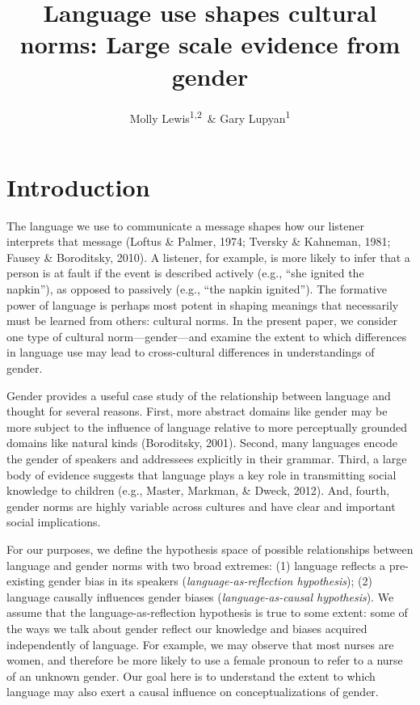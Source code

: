 \documentclass[man]{apa6}
\title{Language use shapes cultural norms: Large scale evidence from gender}
\author{Molly Lewis\textsuperscript{1,2}~\& Gary Lupyan\textsuperscript{1}}
\date{}
\affiliation{
\vspace{0.5cm}
\textsuperscript{1} University of Wisconsin-Madison\\\textsuperscript{2} University of Chicago}
\theoremstyle{definition}
\theoremstyle{definition}
\theoremstyle{definition}
\theoremstyle{remark}
\begin{document}
\maketitle

\section{Introduction}\label{introduction}

The language we use to communicate a message shapes how our listener
interprets that message (Loftus \& Palmer, 1974; Tversky \& Kahneman,
1981; Fausey \& Boroditsky, 2010). A listener, for example, is more
likely to infer that a person is at fault if the event is described
actively (e.g., \enquote{she ignited the napkin}), as opposed to
passively (e.g., \enquote{the napkin ignited}). The formative power of
language is perhaps most potent in shaping meanings that necessarily
must be learned from others: cultural norms. In the present paper, we
consider one type of cultural norm---gender---and examine the extent to
which differences in language use may lead to cross-cultural differences
in understandings of gender.

Gender provides a useful case study of the relationship between language
and thought for several reasons. First, more abstract domains like
gender may be more subject to the influence of language relative to more
perceptually grounded domains like natural kinds (Boroditsky, 2001).
Second, many languages encode the gender of speakers and addressees
explicitly in their grammar. Third, a large body of evidence suggests
that language plays a key role in transmitting social knowledge to
children (e.g., Master, Markman, \& Dweck, 2012). And, fourth, gender
norms are highly variable across cultures and have clear and important
social implications.

For our purposes, we define the hypothesis space of possible
relationships between language and gender norms with two broad extremes:
(1) language reflects a pre-existing gender bias in its speakers
(\emph{language-as-reflection hypothesis}); (2) language causally
influences gender biases (\emph{language-as-causal hypothesis}). We
assume that the language-as-reflection hypothesis is true to some
extent: some of the ways we talk about gender reflect our knowledge and
biases acquired independently of language. For example, we may observe
that most nurses are women, and therefore be more likely to use a female
pronoun to refer to a nurse of an unknown gender. Our goal here is to
understand the extent to which language may also exert a causal
influence on conceptualizations of gender.
\end{document}
